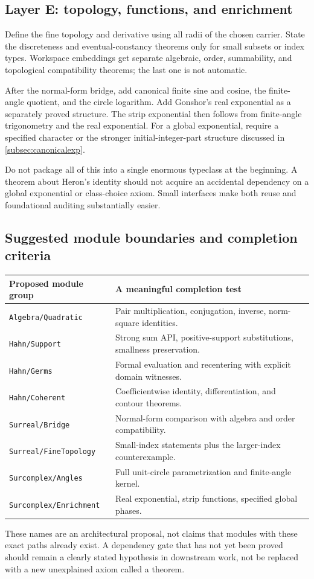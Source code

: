 \documentclass[11pt,letterpaper]{article}
\numberwithin{equation}{section}
\theoremstyle{definition}
\theoremstyle{remark}
\begin{document}
\subsection{Layer E: topology, functions, and enrichment}
Define the fine topology and derivative using all radii of the chosen carrier. State the discreteness and eventual-constancy theorems only for small subsets or index types. Workspace embeddings get separate algebraic, order, summability, and topological compatibility theorems; the last one is not automatic.

After the normal-form bridge, add canonical finite sine and cosine, the finite-angle quotient, and the circle logarithm. Add Gonshor's real exponential as a separately proved structure. The strip exponential then follows from finite-angle trigonometry and the real exponential. For a global exponential, require a specified character or the stronger initial-integer-part structure discussed in \cref{subsec:canonicalexp}.

Do not package all of this into a single enormous typeclass at the beginning. A theorem about Heron's identity should not acquire an accidental dependency on a global exponential or class-choice axiom. Small interfaces make both reuse and foundational auditing substantially easier.

\subsection{Suggested module boundaries and completion criteria}
\begin{center}\small
\begin{tabular}{@{}L{0.27\textwidth}L{0.64\textwidth}@{}}
\toprule
Proposed module group & A meaningful completion test\\\midrule
\texttt{Algebra/Quadratic} & Pair multiplication, conjugation, inverse, norm-square identities.\\
\texttt{Hahn/Support} & Strong sum API, positive-support substitutions, smallness preservation.\\
\texttt{Hahn/Germs} & Formal evaluation and recentering with explicit domain witnesses.\\
\texttt{Hahn/Coherent} & Coefficientwise identity, differentiation, and contour theorems.\\
\texttt{Surreal/Bridge} & Normal-form comparison with algebra and order compatibility.\\
\texttt{Surreal/FineTopology} & Small-index statements plus the larger-index counterexample.\\
\texttt{Surcomplex/Angles} & Full unit-circle parametrization and finite-angle kernel.\\
\texttt{Surcomplex/Enrichment} & Real exponential, strip functions, specified global phases.\\
\bottomrule
\end{tabular}
\end{center}
These names are an architectural proposal, not claims that modules with these exact paths already exist. A dependency gate that has not yet been proved should remain a clearly stated hypothesis in downstream work, not be replaced with a new unexplained axiom called a theorem.
\end{document}
